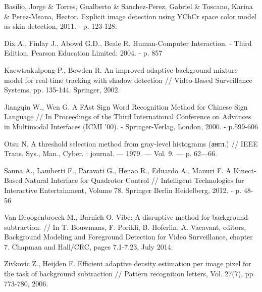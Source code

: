 \newpage
\begin{thebibliography}{99}

Basilio, Jorge \& Torres, Gualberto \& Sanchez-Perez, Gabriel \& Toscano,
Karina \& Perez-Meana, Hector. Explicit image detection using
YCbCr space color model as skin detection, 2011. - p. 123-128. 

Dix A., Finlay J., Abowd G.D., Beale R. Human-Computer Interaction. - Third Edition, Pearson
Education Limited: 2004. - p. 857

Kaewtrakulpong P., Bowden R. An improved adaptive 
background mixture model for real-time tracking with
shadow detection // Video-Based Surveillance Systems, pp.
135-144. Springer, 2002.

Jiangqin W., Wen G. A FAst Sign Word Recognition Method for Chinese Sign Language // In 
Proceedings of the Third International Conference on Advances in Multimodal Interfaces (ICMI 
'00). - Springer-Verlag, London, 2000. - p.599-606

Otsu N. A threshold selection method from gray-level histograms
(англ.) // IEEE Trans. Sys., Man., Cyber. : journal. — 1979. — Vol. 9.
— p. 62—66.

Sanna A., Lamberti F., Paravati G., Henao R., Eduardo A., Manuri F. A Kinect-Based Natural
Interface for Quadrotor Control // Intelligent Technologies for Interactive Entertainment, 
Volume 78. Springer Berlin Heidelberg, 2012. - p. 48-56

Van Droogenbroeck M., Barnich O. Vibe: A disruptive
method for background subtraction. // In T. Bouwmans, F.
Porikli, B. Hoferlin, A. Vacavant, editors, Background
Modeling and Foreground Detection for Video Surveillance,
chapter 7. Chapman and Hall/CRC, pages 7.1-7.23, July
2014.

Zivkovic Z., Heijden F. Efficient adaptive density
estimation per image pixel for the task of background
subtraction // Pattern recognition letters, Vol. 27(7),
pp. 773-780, 2006.

\end{thebibliography}

